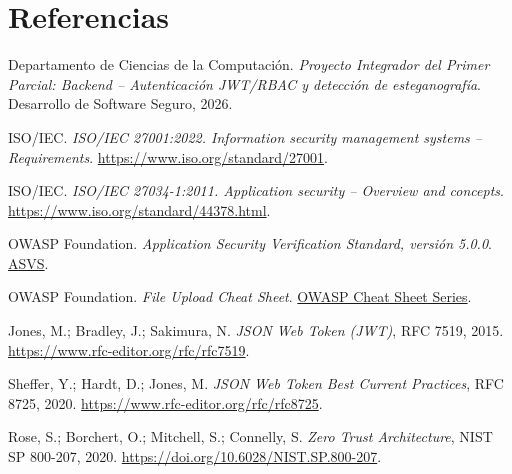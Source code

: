 \documentclass[11pt,a4paper,oneside]{article}
\begin{document}
\section*{Referencias}
\begin{enumerate}[label={[\arabic*]},leftmargin=2em,itemsep=4pt]
\item Departamento de Ciencias de la Computación. \emph{Proyecto Integrador del Primer Parcial: Backend -- Autenticación JWT/RBAC y detección de esteganografía}. Desarrollo de Software Seguro, 2026.
\item ISO/IEC. \emph{ISO/IEC 27001:2022. Information security management systems -- Requirements}. \url{https://www.iso.org/standard/27001}.
\item ISO/IEC. \emph{ISO/IEC 27034-1:2011. Application security -- Overview and concepts}. \url{https://www.iso.org/standard/44378.html}.
\item OWASP Foundation. \emph{Application Security Verification Standard, versión 5.0.0}. \href{https://asvs.owasp.org/}{ASVS}.
\item OWASP Foundation. \emph{File Upload Cheat Sheet}. \href{https://cheatsheetseries.owasp.org/cheatsheets/File_Upload_Cheat_Sheet.html}{OWASP Cheat Sheet Series}.
\item Jones, M.; Bradley, J.; Sakimura, N. \emph{JSON Web Token (JWT)}, RFC 7519, 2015. \url{https://www.rfc-editor.org/rfc/rfc7519}.
\item Sheffer, Y.; Hardt, D.; Jones, M. \emph{JSON Web Token Best Current Practices}, RFC 8725, 2020. \url{https://www.rfc-editor.org/rfc/rfc8725}.
\item Rose, S.; Borchert, O.; Mitchell, S.; Connelly, S. \emph{Zero Trust Architecture}, NIST SP 800-207, 2020. \url{https://doi.org/10.6028/NIST.SP.800-207}.
\end{enumerate}

\appendix
\end{document}
